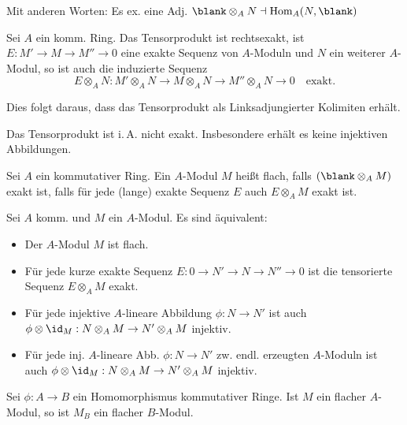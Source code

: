 \documentclass{cheat-sheet}
\DeclareMathOperator{\Hom}{Hom} %
\newcommand{\ladj}{\dashv} %
\begin{document}
\begin{bem}
  Mit anderen Worten: Es ex. eine Adj. \enspace $\blank \otimes_A N \ladj \Hom_A(N, \blank)$
\end{bem}


\begin{prop}
  Sei $A$ ein komm. Ring.
  Das Tensorprodukt ist rechtsexakt, \dh{} ist $E : M' \to M \to M'' \to 0$ eine exakte Sequenz von $A$-Moduln und $N$ ein weiterer $A$-Modul, so ist auch die induzierte Sequenz
  \[
    E \otimes_A N : M' \otimes_A N \to M \otimes_A N \to M'' \otimes_A N \to 0
    \quad \text{exakt.}
  \]
\end{prop}

\begin{bem}
  Dies folgt daraus, dass das Tensorprodukt als Linksadjungierter Kolimiten erhält.
\end{bem}

\begin{acht}
  Das Tensorprodukt ist i.\,A. nicht exakt.
  Insbesondere erhält es keine injektiven Abbildungen.
\end{acht}


\begin{defn}
  Sei $A$ ein kommutativer Ring.
  Ein $A$-Modul $M$ heißt flach, falls $(\blank \otimes_A M)$ exakt ist, \dh{} falls für jede (lange) exakte Sequenz $E$ auch $E \otimes_A M$ exakt ist.
\end{defn}

\begin{prop}
  Sei $A$ komm. und $M$ ein $A$-Modul.
  Es sind äquivalent:
  \begin{itemize}
    \item Der $A$-Modul $M$ ist flach.
    \item Für jede kurze exakte Sequenz $E : 0 \to N' \to N \to N'' \to 0$ ist die tensorierte Sequenz $E \otimes_A M$ exakt.
    \item Für jede injektive $A$-lineare Abbildung $\phi : N \to N'$ ist auch $\phi \otimes \id_M : N \otimes_A M \to N' \otimes_A M$ injektiv.
    \item Für jede inj. $A$-lineare Abb. $\phi : N \to N'$ zw. endl. erzeugten $A$-Moduln ist auch $\phi \otimes \id_M : N \otimes_A M \to N' \otimes_A M$ injektiv.
  \end{itemize}
\end{prop}

\begin{prop}
  Sei $\phi : A \to B$ ein Homomorphismus kommutativer Ringe.
  Ist $M$ ein flacher $A$-Modul, so ist $M_B$ ein flacher $B$-Modul.
\end{prop}
\end{document}
